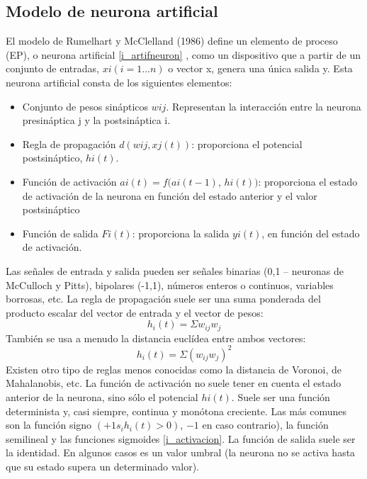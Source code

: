 \documentclass[12pt]{book} %
\begin{document}
	\subsection{Modelo de neurona artificial}
		 El modelo de Rumelhart y McClelland (1986) define un elemento de proceso (EP), o neurona artificial \ref{i_artifneuron} , como un dispositivo
		 que a partir de un conjunto de entradas, $xi (i=1...n)$ o vector x, genera una única salida y.
		 Esta neurona artificial consta de los siguientes elementos:
		 \begin{multicols}{2}
		 \begin{itemize}
		 	\item Conjunto de pesos sinápticos $wij$. Representan la interacción entre la neurona presináptica j y la postsináptica i.
		 	\item Regla de propagación $d(wij,xj(t))$: proporciona el potencial postsináptico, $hi(t)$.
		 	\item Función de activación $ai(t)=f(ai(t-1)$, $hi(t))$: proporciona el estado de activación de la neurona en función del estado anterior y
		 		 el valor postsináptico
		 	\item Función de salida $Fi(t)$: proporciona la salida $yi(t)$, en función del estado de activación.
		 \end{itemize}
		 \end{multicols}
		  Las señales de entrada y salida pueden ser señales binarias (0,1 – neuronas de McCulloch y Pitts), bipolares (-1,1), números enteros o
		  continuos, variables borrosas, etc.
		  La regla de propagación suele ser una suma ponderada del producto escalar del vector de entrada y el vector de pesos: 
		  $$ h_{i}(t) = \Sigma w_{ij}w_{j}$$
		  También se usa a menudo la distancia euclídea entre ambos vectores: 
		  $$ h_{i}(t) = \Sigma (w_{ij}w_{j})^{2}$$
		  Existen otro tipo de reglas menos conocidas como la distancia de Voronoi, de Mahalanobis, etc.
		  La función de activación no suele tener en cuenta el estado anterior de la neurona, sino sólo el potencial $hi(t)$. Suele ser una función
		  determinista y, casi siempre, continua y monótona creciente. Las más comunes son la función signo $(+1 s_{i} h_{i}(t)>0)$, $-1$ 
		  en caso contrario), la función semilineal y las funciones sigmoides \ref{i_activacion}.
		  La función de salida suele ser la identidad. En algunos casos es un valor umbral (la neurona no se activa hasta que su estado supera un
		  determinado valor).
\end{document}
